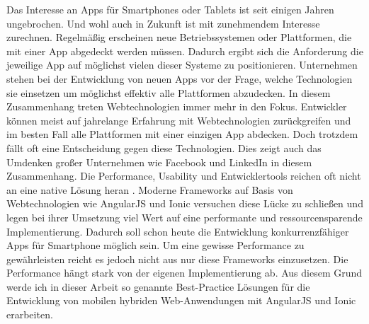 Das Interesse an Apps für Smartphones oder Tablets ist seit einigen Jahren ungebrochen. Und wohl auch in Zukunft ist mit zunehmendem Interesse zurechnen. Regelmäßig erscheinen neue Betriebssystemen oder Plattformen, die mit einer App abgedeckt werden müssen. Dadurch ergibt sich die Anforderung die jeweilige App auf möglichst vielen dieser Systeme zu positionieren. Unternehmen stehen bei der Entwicklung von neuen Apps vor der Frage, welche Technologien sie einsetzen um möglichst effektiv alle Plattformen abzudecken. In diesem Zusammenhang treten Webtechnologien immer mehr in den Fokus. Entwickler können meist auf jahrelange Erfahrung mit Webtechnologien zurückgreifen und im besten Fall alle Plattformen mit einer einzigen App abdecken. Doch trotzdem fällt oft eine Entscheidung gegen diese Technologien. Dies zeigt auch das Umdenken großer Unternehmen wie Facebook\cite{fb-enginering-backtonative} und LinkedIn\cite{li-engineering-backtonative} in diesem Zusammenhang. Die Performance, Usability und Entwicklertools reichen oft nicht an eine native Lösung heran \cite{mobilewebslow}. Moderne Frameworks auf Basis von Webtechnologien wie AngularJS und Ionic versuchen diese Lücke zu schließen und legen bei ihrer Umsetzung viel Wert auf eine performante und ressourcensparende Implementierung. Dadurch soll schon heute die Entwicklung konkurrenzfähiger Apps für Smartphone möglich sein. Um eine gewisse Performance zu gewährleisten reicht es jedoch nicht aus nur diese Frameworks einzusetzen. Die Performance hängt stark von der eigenen Implementierung ab. Aus diesem Grund werde ich in dieser Arbeit so genannte Best-Practice Lösungen für die Entwicklung von mobilen hybriden Web-Anwendungen mit AngularJS und Ionic erarbeiten. 
